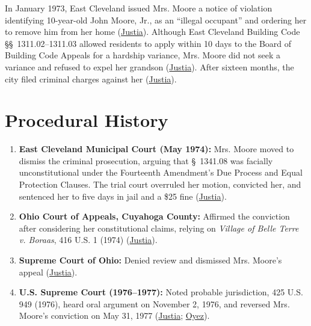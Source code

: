\documentclass[12pt]{article}
\begin{document}
In January 1973, East Cleveland issued Mrs. Moore a notice of violation identifying 10-year-old John Moore, Jr., as an ``illegal occupant'' and ordering her to remove him from her home (\href{https://supreme.justia.com/cases/federal/us/431/494/}{Justia}). Although East Cleveland Building Code \S\S~1311.02--1311.03 allowed residents to apply within 10 days to the Board of Building Code Appeals for a hardship variance, Mrs. Moore did not seek a variance and refused to expel her grandson (\href{https://supreme.justia.com/cases/federal/us/431/494/}{Justia}). After sixteen months, the city filed criminal charges against her (\href{https://supreme.justia.com/cases/federal/us/431/494/}{Justia}).

\section{Procedural History}
\begin{enumerate}
\item \textbf{East Cleveland Municipal Court (May 1974):} Mrs. Moore moved to dismiss the criminal prosecution, arguing that \S~1341.08 was facially unconstitutional under the Fourteenth Amendment's Due Process and Equal Protection Clauses. The trial court overruled her motion, convicted her, and sentenced her to five days in jail and a \$25 fine (\href{https://supreme.justia.com/cases/federal/us/431/494/}{Justia}).
\item \textbf{Ohio Court of Appeals, Cuyahoga County:} Affirmed the conviction after considering her constitutional claims, relying on \textit{Village of Belle Terre v. Boraas}, 416 U.S. 1 (1974) (\href{https://supreme.justia.com/cases/federal/us/431/494/}{Justia}).
\item \textbf{Supreme Court of Ohio:} Denied review and dismissed Mrs. Moore's appeal (\href{https://supreme.justia.com/cases/federal/us/431/494/}{Justia}).
\item \textbf{U.S. Supreme Court (1976--1977):} Noted probable jurisdiction, 425 U.S. 949 (1976), heard oral argument on November 2, 1976, and reversed Mrs. Moore's conviction on May 31, 1977 (\href{https://supreme.justia.com/cases/federal/us/431/494/}{Justia}; \href{https://www.oyez.org/cases/1976/75-6289}{Oyez}).
\end{enumerate}
\end{document}
